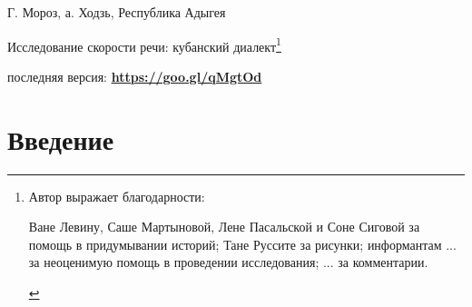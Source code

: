 
\usepackage{alltt}

\begin{flushright}
	{\footnotesize Г. Мороз, а. Ходзь, Республика Адыгея}
\end{flushright}
\begin{center}{\Large Исследование скорости речи: кубанский диалект\footnote{Автор выражает благодарности:
\begin{itemize}
\mytem Ване Левину, Саше Мартыновой, Лене Пасальской и Соне Сиговой за помощь в придумывании историй;
\mytem Тане Руссите за рисунки;
\mytem информантам ... за неоценимую помощь в проведении исследования;
\mytem ... за комментарии.
\end{itemize}}}
\end{center}
{\noindent\footnotesize последняя версия: \textbf{\href{https://goo.gl/qMgtOd}{https://goo.gl/qMgtOd}}}
\vspace{5mm}
\tableofcontents
\vfill
{~}\\
\pagebreak
\section{Введение}
